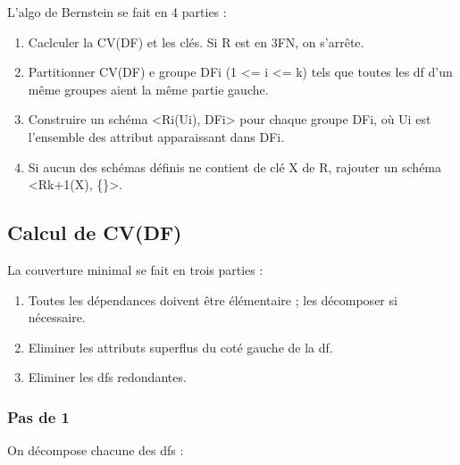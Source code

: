 \documentclass[a4paper,sffamily,12pt]{article}
\begin{document}
		\noindent L'algo de Bernstein se fait en 4 parties :
	
			\begin{enumerate}[label=\ding{228}]
				\item Caclculer la CV(DF) et les clés. Si R est en 3FN, on s'arrête. 
				\item Partitionner CV(DF) e groupe DFi (1 <= i <= k) tels que toutes les df d'un même groupes aient la même partie gauche. 
				\item Construire un schéma <Ri(Ui), DFi> pour chaque groupe DFi, où Ui est l'ensemble des attribut apparaissant dans DFi.
				\item Si aucun des schémas définis ne contient de clé X de R, rajouter un schéma <Rk+1(X), \{\}>.
			\end{enumerate}	
			
		\subsection{Calcul de CV(DF)}

			\vspace{0.5cm}

			\noindent La couverture minimal se fait en trois parties :

			\begin{enumerate}[label=\ding{228}]
				\item Toutes les dépendances doivent être élémentaire ; les décomposer si nécessaire.
				\item Eliminer les attributs superflus du coté gauche de la df.
				\item Eliminer les dfs redondantes.
			\end{enumerate}	
			
			\vspace{0.5cm}
				
			\subsubsection{Pas de 1}

				\vspace{0.5cm}

				\noindent On décompose chacune des dfs : \\
\end{document}
